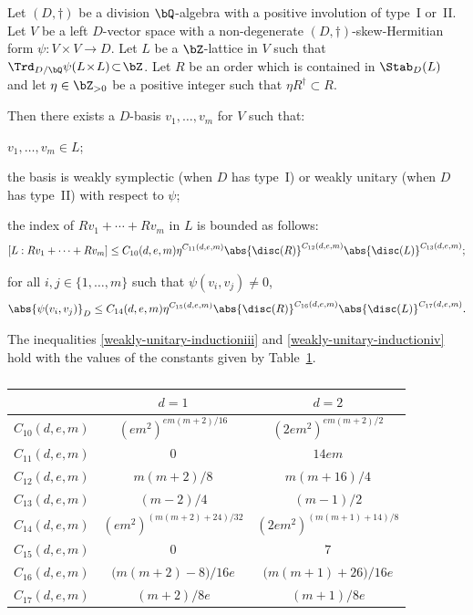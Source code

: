 \begin{proposition} \label{weakly-unitary-induction}
Let $(D,\dag)$ be a division $\bQ$-algebra with a positive involution of type~I or~II.
Let $V$ be a left $D$-vector space with a non-degenerate $(D,\dag)$-skew-Hermitian form $\psi \colon V \!\times\! V \!\to\! D$.
Let $L$ be a $\bZ$-lattice in $V$ such that \hbox{$\Trd_{D/\bQ} \psi(L \!\times\! L) \!\subset\! \bZ$}.
Let $R$ be an order which is contained in $\Stab_D(L)$ and let $\eta \in \bZ_{>0}$ be a positive integer such that $\eta R^\dag \subset R$.

Then there exists a $D$-basis $v_1, \dotsc, v_m$ for $V$ such that:
\begin{enumeratei}
\item\label{weakly-unitary-inductioni} $v_1, \dotsc, v_m \in L$;
\item\label{weakly-unitary-inductionii} the basis is weakly symplectic (when $D$ has type~I) or weakly unitary (when $D$ has type~II) with respect to $\psi$;
\item\label{weakly-unitary-inductioniii} the index of $Rv_1 + \dotsb + Rv_m$ in $L$ is bounded as follows:
\[
[L : Rv_1 + \dotsb + Rv_m] \leq C_{10}(d,e,m) \eta^{C_{11}(d,e,m)} \abs{\disc(R)}^{C_{12}(d,e,m)} \abs{\disc(L)}^{C_{13}(d,e,m)};
\]
\item\label{weakly-unitary-inductioniv} for all $i, j \in \{ 1, \dotsc, m \}$ such that $\psi(v_i, v_j) \neq 0$,
\[
\abs{\psi(v_i, v_j)}_D \leq C_{14}(d, e, m) \eta^{C_{15}(d,e,m)} \abs{\disc(R)}^{C_{16}(d,e,m)} \abs{\disc(L)}^{C_{17}(d,e,m)}.
\]
\end{enumeratei}

The inequalities \eqref{weakly-unitary-inductioniii} and \eqref{weakly-unitary-inductioniv} hold with the values of the constants given by Table~\ref{Table:1}.
\begin{table}
\caption{\label{Table:1}}
\begin{center}
\bgroup
\renewcommand{\arraystretch}{1.4}
\begin{tabular}{|c|c|c|}
\hline
& $d=1$
& $d=2$
\\ \hline
$C_{10}(d,e,m)$
& $(em^2)^{em(m+2)/16}$
& $(2em^2)^{em(m+2)/2}$
\\ $C_{11}(d,e,m)$
& $0$
& $14em$
\\ $C_{12}(d,e,m)$
& $m(m+2)/8$
& $m(m+16)/4$
\\ $C_{13}(d,e,m)$
& $(m-2)/4$
& $(m-1)/2$
\\ $C_{14}(d,e,m)$
& $(em^2)^{(m(m+2)+24)/32}$
& $(2em^2)^{(m(m+1)+14)/8}$
\\ $C_{15}(d,e,m)$
& $0$
& $7$
\\ $C_{16}(d,e,m)$
& $\bigl( m(m+2)-8 \bigr)/16e$
& $\bigl( m(m+1)+26 \bigr)/16e$
\\ $C_{17}(d,e,m)$
& $(m+2)/8e$
& $(m+1)/8e$\\
\hline
\end{tabular}
\egroup
\end{center}
\vspace*{-\baselineskip}
\end{table}
\end{proposition}

